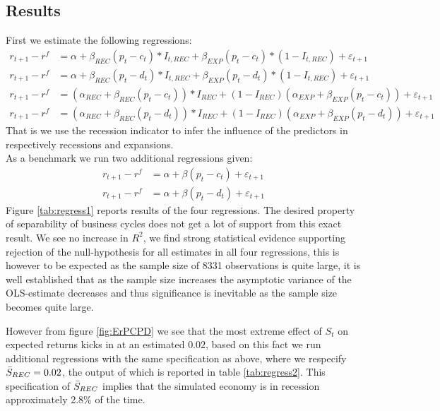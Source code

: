 \subsection{Results}
First we estimate the following regressions:
\begin{align*}
     r_{t+1} - r^{f} &= \alpha + \beta_{REC} \left( p_t - c_t \right) * I_{t,REC} + \beta_{EXP} \left( p_t - c_t \right) * \left(1 - I_{t,REC}\right)  + \varepsilon_{t+1}\\
      r_{t+1} - r^{f} &= \alpha + \beta_{REC} \left( p_t - d_t \right) * I_{t,REC} + \beta_{EXP} \left( p_t - d_t \right) * \left(1 - I_{t,REC}\right)  + \varepsilon_{t+1}\\
      r_{t+1} - r^{f} &= \left(\alpha_{REC} + \beta_{REC} \left(p_t - c_t\right)\right)*I_{REC} + \left(1-I_{REC}\right) \left( \alpha_{EXP} + \beta_{EXP}\left(p_t - c_t \right) \right) + \varepsilon_{t+1}\\
r_{t+1} - r^{f} &= \left(\alpha_{REC} + \beta_{REC} \left(p_t - d_t\right)\right)*I_{REC} + \left(1-I_{REC}\right) \left( \alpha_{EXP} + \beta_{EXP}\left(p_t - d_t \right) \right) + \varepsilon_{t+1}      
\end{align*}
That is we use the recession indicator to infer the influence of the predictors in respectively recessions and expansions.\\
As a benchmark we run two additional regressions given:
\begin{align*}
     r_{t+1} - r^{f} &= \alpha + \beta \left( p_t - c_t \right)  + \varepsilon_{t+1}\\
      r_{t+1} - r^{f} &= \alpha + \beta \left( p_t - d_t \right) + \varepsilon_{t+1}
\end{align*}
Figure \ref{tab:regress1} reports results of the four regressions. The desired property of separability of business cycles does not get a lot of support from this exact result. We see no increase in $R^2$, we find strong statistical evidence supporting rejection of the null-hypothesis for all estimates in all four regressions, this is however to be expected as the sample size of 8331 observations is quite large, it is well established that as the sample size increases the asymptotic variance of the OLS-estimate decreases and thus significance is inevitable as the sample size becomes quite large.


However from figure \ref{fig:ErPCPD} we see that the most extreme effect of $S_t$ on expected returns kicks in at an estimated $0.02$, based on this fact we run additional regressions with the same specification as above, where we respecify $\Bar{S}_{REC}=0.02$, the output of which is reported in table \ref{tab:regress2}. This specification of $\Bar{S}_{REC}$ implies that the simulated economy is in recession approximately 2.8\% of the time.

